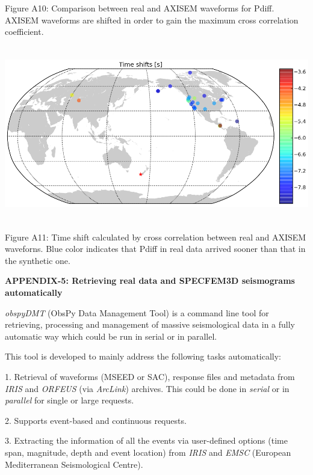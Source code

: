 \documentclass{article}
\begin{document}
\begin{center}
{\small{}Figure A10: Comparison between real and AXISEM waveforms for Pdiff. AXISEM 
waveforms are shifted in order to gain the maximum cross correlation coefficient.}

\includegraphics[width=446pt, height=217pt, keepaspectratio=true]{AXISEMTutorial-fig017.png}

{\small{}Figure A11: Time shift calculated by cross correlation between real and 
AXISEM waveforns. Blue color indicates that Pdiff in real data arrived sooner than 
that in the synthetic one.}
\end{center}

\baselineskip=13pt
\leftskip=0pt
{\large{}\textbf{APPENDIX-5: Retrieving real data and SPECFEM3D seismograms automatically}}

{\color{color18} \emph{obspyDMT}} (ObsPy Data Management Tool) is a command line 
tool for retrieving, processing and management of massive seismological data in 
a fully automatic way which could be run in serial or in parallel. 

This tool is developed to mainly address the following tasks automatically:

1. Retrieval of waveforms (MSEED or SAC), response files and metadata from {\color{color18} \emph{IRIS}} 
and {\color{color18} \emph{ORFEUS}} (via {\color{color18} \emph{ArcLink}}) archives. 
This could be done in \textit{serial} or in \textit{parallel} for single or large 
requests.

2. Supports event-based and continuous requests.

3. Extracting the information of all the events via user-defined options (time 
span, magnitude, depth and event location) from {\color{color18} \emph{IRIS}} and 
{\color{color18} \emph{EMSC}} (European Mediterranean Seismological Centre).
\end{document}
